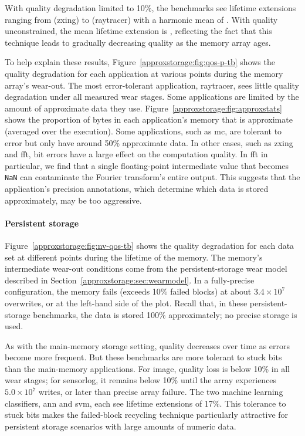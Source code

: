 With quality degradation limited to 10\%, the benchmarks see lifetime
extensions ranging from  (\textsf{zxing}) to
 (\textsf{raytracer}) with
a harmonic mean of . With quality unconstrained, the mean lifetime
extension is , reflecting the fact that this technique leads to gradually
decreasing quality as the memory array ages.

To help explain these results, Figure~\ref{approxstorage:fig:qos-p-tb} shows the quality
degradation for each application at various points during the memory array's
wear-out.
The most error-tolerant application, \textsf{raytracer}, sees
little quality degradation under all measured wear stages.
Some applications are limited by the amount of approximate data they use.
Figure~\ref{approxstorage:fig:approxstats} shows the proportion of bytes in each
application's memory that is approximate (averaged over the execution).
Some applications,
such as \textsf{mc}, are tolerant to error but only have around 50\%
approximate data. In other
cases, such as \textsf{zxing} and \textsf{fft}, bit errors
have a large effect on the computation quality. In \textsf{fft} in
particular, we find that a single floating-point intermediate value that
becomes \verb+NaN+ can contaminate the Fourier transform's entire output.
This suggests that the application's precision
annotations, which determine which data is stored approximately, may be
too aggressive.

\paragraph{Persistent storage}

Figure~\ref{approxstorage:fig:nv-qos-tb} shows the quality degradation for each data set at
different points during the lifetime of the memory.
The memory's intermediate
wear-out conditions come from the persistent-storage wear model described in
Section~\ref{approxstorage:sec:wearmodel}.
In a fully-precise configuration, the memory fails (exceeds 10\% failed blocks)
at about $3.4 \times 10^{7}$ overwrites, or at the left-hand side of the plot.
Recall that, in these persistent-storage benchmarks, the data is stored 100\%
approximately; no precise storage is used.

As with the main-memory storage setting, quality decreases over time as errors
become more frequent. But these benchmarks are more tolerant to stuck bits
than the main-memory applications. For \textsf{image}, quality loss is below
10\% in all wear stages; for \textsf{sensorlog}, it remains below 10\% until
the array experiences
$5.0 \times 10^{7}$ writes, or  later than precise array failure.
The two machine learning classifiers, \textsf{ann} and \textsf{svm},
each see lifetime extensions of 17\%.
This tolerance to
stuck bits makes the failed-block recycling technique particularly attractive
for persistent storage scenarios with large amounts of numeric data.


